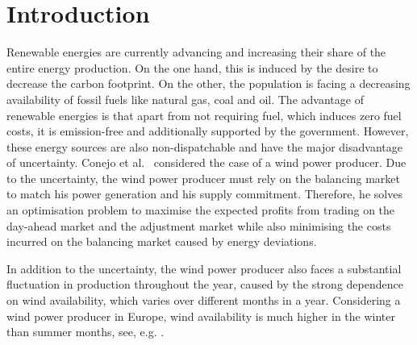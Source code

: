 \section{Introduction}

Renewable energies are currently advancing and increasing their share of the entire energy production. On the one hand, this is induced by the desire to decrease the carbon footprint. On the other, the population is facing a decreasing availability of fossil fuels like natural gas, coal and oil. The advantage of renewable energies is that apart from not requiring fuel, which induces zero fuel costs, it is emission-free and additionally supported by the government. However, these energy sources are also non-dispatchable and have the major disadvantage of uncertainty. Conejo et al.\ \cite{Conejo10} considered the case of a wind power producer. Due to the uncertainty, the wind power producer must rely on the balancing market to match his power generation and his supply commitment. Therefore, he solves an optimisation problem to maximise the expected profits from trading on the day-ahead market and the adjustment market while also minimising the costs incurred on the balancing market caused by energy deviations. 

In addition to the uncertainty, the wind power producer also faces a substantial fluctuation in production throughout the year, caused by the strong dependence on wind availability, which varies over different months in a year. Considering a wind power producer in Europe, wind availability is much higher in the winter than summer months, see, e.g. \cite{W11}. 

